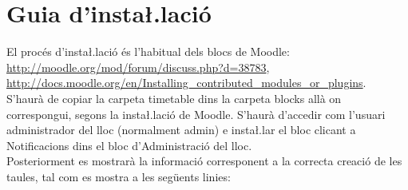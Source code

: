 \documentclass[a4paper]{report}  %
\begin{document}
\chapter{Guia d'insta\l.lació}
El procés d'insta\l.lació és l'habitual dels blocs de Moodle:\\ 
\url{http://moodle.org/mod/forum/discuss.php?d=38783},\\ 
\url{http://docs.moodle.org/en/Installing_contributed_modules_or_plugins}.\\
S'haurà de copiar la carpeta timetable dins la carpeta blocks allà on correspongui, segons la insta\l.lació de Moodle.
S'haurà d'accedir com l'usuari administrador del lloc (normalment admin) e insta\l.lar el bloc clicant a Notificacions dins el bloc d'Administració del lloc.\\
Posteriorment es mostrarà la informació corresponent a la correcta creació de les taules, tal com es mostra a les següents linies:
\end{document}
